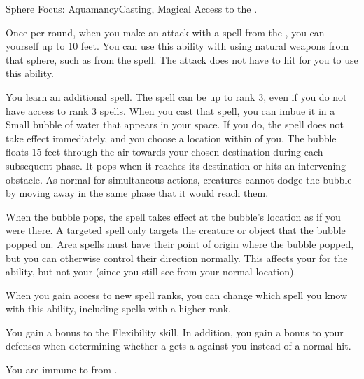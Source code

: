   \begin{magicalfeat}{Sphere Focus: Aquamancy}{Casting, Magical}
    \featpre Access to the  .

     Once per round, when you make an attack with a spell from the  , you can  yourself up to 10 feet.
    You can use this ability with  using natural weapons from that sphere, such as from the  spell.
    The attack does not have to hit for you to use this ability.

     You learn an additional spell.
    The spell can be up to rank 3, even if you do not have access to rank 3 spells.
    When you cast that spell, you can imbue it in a Small bubble of water that appears in your space.
    If you do, the spell does not take effect immediately, and you choose a location within \medrange of you.
    The bubble floats 15 feet through the air towards your chosen destination during each subsequent phase.
    It pops when it reaches its destination or hits an intervening obstacle.
    As normal for simultaneous actions, creatures cannot dodge the bubble by moving away in the same phase that it would reach them.

    When the bubble pops, the spell takes effect at the bubble's location as if you were there.
    A targeted spell only targets the creature or object that the bubble popped on.
    Area spells must have their point of origin where the bubble popped, but you can otherwise control their direction normally.
    This affects your  for the ability, but not your  (since you still see from your normal location).

    When you gain access to new spell ranks, you can change which spell you know with this ability, including spells with a higher rank.

     You gain a  bonus to the Flexibility skill.
    In addition, you gain a  bonus to your defenses when determining whether a  gets a  against you instead of a normal hit.

     You are immune to  from .
  \end{magicalfeat}

